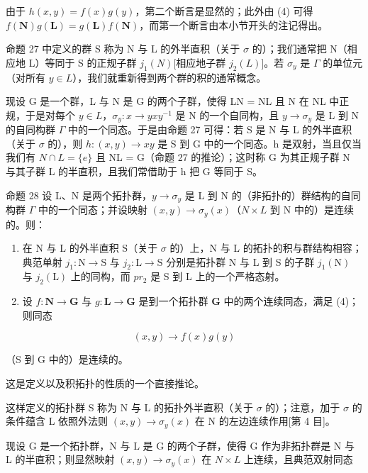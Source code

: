 由于 \(h(x, y) = f(x)g(y)\)，第二个断言是显然的；此外由 (4) 可得 \(f(\mathbf{N})g(\mathbf{L}) = g(\mathbf{L})f(\mathbf{N})\)，而第一个断言由本小节开头的注记得出。

命题 27 中定义的群 S 称为 N 与 L 的外半直积（关于 \(\sigma\) 的）；我们通常把 N（相应地 L）等同于 S 的正规子群 \(j_{1}(N)\){[}相应地子群 \(j_{2}(L)\){]}。若 \(\sigma_{y}\) 是 \(\Gamma\) 的单位元（对所有 \(y \in L\)），我们就重新得到两个群的积的通常概念。

现设 G 是一个群，L 与 N 是 G 的两个子群，使得 LN = NL 且 N 在 NL 中正规，于是对每个 \(y \in L\)，\(\sigma_{y} : x \to yxy^{-1}\) 是 N 的一个自同构，且 \(y \to \sigma_{y}\) 是 L 到 N 的自同构群 \(\Gamma\) 中的一个同态。于是由命题 27 可得：若 S 是 N 与 L 的外半直积（关于 \(\sigma\) 的），则 \(h : (x, y) \to xy\) 是 S 到 G 中的一个同态。h 是双射，当且仅当我们有 \(N \cap L = \{e\}\) 且 NL = G（命题 27 的推论）；这时称 G 为其正规子群 N 与其子群 L 的半直积，且我们常借助于 h 把 G 等同于 S。

命题 28 设 L、N 是两个拓扑群，\(y \to \sigma_y\) 是 L 到 N 的（非拓扑的）群结构的自同构群 \(\Gamma\) 中的一个同态；并设映射 \((x, y) \to \sigma_y(x)\)（\(N \times L\) 到 N 中的）是连续的。则：

\begin{enumerate}
\def\labelenumi{\arabic{enumi})}
\item
  在 N 与 L 的外半直积 S（关于 \(\sigma\) 的）上，N 与 L 的拓扑的积与群结构相容；典范单射 \(j_{1}: \mathrm{N} \to \mathrm{S}\) 与 \(j_{2}: \mathrm{L} \to \mathrm{S}\) 分别是拓扑群 N 与 L 到 S 的子群 \(j_{1}(\mathrm{N})\) 与 \(j_{2}(\mathrm{L})\) 上的同构，而 \(pr_{2}\) 是 S 到 L 上的一个严格态射。
\item
  设 \(f: \mathbf{N} \to \mathbf{G}\) 与 \(g: \mathbf{L} \to \mathbf{G}\) 是到一个拓扑群 \(\mathbf{G}\) 中的两个连续同态，满足 (4)；则同态
\end{enumerate}

\[
(x, y) \rightarrow f (x) g (y)
\]

（S 到 G 中的）是连续的。

这是定义以及积拓扑的性质的一个直接推论。

这样定义的拓扑群 S 称为 N 与 L 的拓扑外半直积（关于 \(\sigma\) 的）；注意，加于 \(\sigma\) 的条件蕴含 L 依照外法则 \((x, y) \to \sigma_{y}(x)\) 在 N 的左边连续作用{[}第 4 目{]}。

现设 G 是一个拓扑群，N 与 L 是 G 的两个子群，使得 G 作为非拓扑群是 N 与 L 的半直积；则显然映射 \((x, y) \to \sigma_{y}(x)\) 在 \(N \times L\) 上连续，且典范双射同态

